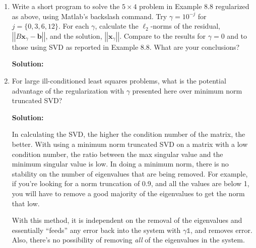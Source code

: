 \documentclass[12pt]{article}
\newcommand{\norm}[1]{\left|\left| #1 \right|\right|}
\newcommand{\Id}{\mathbb{1}}
\begin{document}
\begin{enumerate}
\begin{enumerate}
  \item Write a short program to solve the $5 \times 4$ problem in Example 8.8 regularized
  as above, using {\sc Matlab}'s backslash command. Try $\gamma = 10^{-j}$ for
  $j = \{ 0, 3, 6, 12\}$. For each $\gamma$, calculate the $\ell_{2}$-norms of the
  residual, $\norm{B\mathbf{x}_{\gamma} - \mathbf{b}}$, and the solution, $\norm{\mathbf{x}_{\gamma}}$.
  Compare to the results for $\gamma = 0$ and to those using SVD as reported in
  Example 8.8. What are your conclusions?

  {\bf Solution:}

  \item For large ill-conditioned least squares problems, what is the potential advantage
  of the regularization with $\gamma$ presented here over minimum norm truncated SVD?

  {\bf Solution:}

  In calculating the SVD, the higher the condition number of the matrix, the better.
  With using a minimum norm truncated SVD on a matrix with a low condition number, the
  ratio between the max singular value and the minimum singular value is low. In doing a
  minimum norm, there is no stability on the number of eigenvalues that are being removed.
  For example, if you're looking for a norm truncation of 0.9, and all the values are below 1,
  you will have to remove a good majority of the eigenvalues to get the norm that low.

  With this method, it is independent on the removal of the eigenvalues and essentially
  ``feeds'' any error back into the system with $\gamma\Id$, and removes error. Also,
  there's no possibility of removing {\em all} of the eigenvalues in the system.

\end{enumerate}
\end{enumerate}

\end{document}

